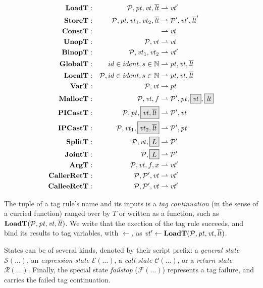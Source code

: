 \documentclass[acmsmall,review,anonymous]{acmart}\settopmatter{printfolios=true,printccs=false,printacmref=false}
\begin{document}
\begin{figure}
  \[\begin{aligned}
  \loadtname      & : & \loadtargs & \rightharpoonup \loadtres \\
  \storetname     & : & \storetargs & \rightharpoonup \storetres \\
  \consttname     & : & & \rightharpoonup \consttres \\
  \unoptname      & : & \unoptargs & \rightharpoonup \unoptres \\
  \binoptname     & : & \binoptargs & \rightharpoonup \binoptres \\
  \globaltname    & : & \globaltargstyped & \rightharpoonup \globaltres \\
  \localtname     & : & \localtargstyped & \rightharpoonup \localtres \\
  \vartname       & : & \vartargs & \rightharpoonup \vartres \\
  \malloctname    & : & \malloctargs & \rightharpoonup \malloctres \\
  \picasttname    & : & \picasttargs & \rightharpoonup \picasttres \\
  \ipcasttname    & : & \ipcasttargs & \rightharpoonup \ipcasttres \\
  \splittname     & : & \splittargs & \rightharpoonup \splittres \\
  \jointname      & : & \jointargs & \rightharpoonup \jointres \\
  \argtname       & : & \argtargs & \rightharpoonup \argtres \\
  \callerrettname & : & \callerrettargs & \rightharpoonup \callerrettres \\
  \calleerettname & : & \calleerettargs & \rightharpoonup \calleerettres \\
  \end{aligned}\]

  \label{fig:controlpoints}
\end{figure}

The tuple of a tag rule's name and its inputs is a {\it tag continuation} (in the sense of a curried function)
ranged over by \(T\) or written as a function, such as \(\mathbf{LoadT}(\mathcal{P}, \mathit{pt}, \mathit{vt}, \overline{\mathit{lt}})\). We write that the exection of the
tag rule succeeds, and bind its results to tag variables, with \(\leftarrow\), as \(\mathit{vt}' \leftarrow \mathbf{LoadT}(\mathcal{P}, \mathit{pt}, \mathit{vt}, \overline{\mathit{lt}})\).

States can be of several kinds, denoted by their script prefix: a {\em general state} \(\mathcal{S}(\dots)\),
an {\em expression state} \(\mathcal{E}(\dots)\), a {\em call state} \(\mathcal{C}(\dots)\), or a
{\em return state} \(\mathcal{R}(\dots)\). Finally, the special state {\em failstop} (\(\mathcal{F}(\dots)\))
represents a tag failure, and carries the failed tag continuation.
\end{document}

